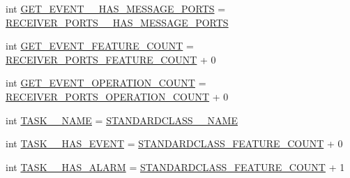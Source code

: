 \begin{DoxyCompactItemize}
\item 
int \hyperlink{interfaceshootingmachineemfmodel_1_1_shootingmachineemfmodel_package_a4ab331e8bfd030492ae5d6194070c1d7}{G\-E\-T\-\_\-\-E\-V\-E\-N\-T\-\_\-\-\_\-\-H\-A\-S\-\_\-\-M\-E\-S\-S\-A\-G\-E\-\_\-\-P\-O\-R\-T\-S} = \hyperlink{interfaceshootingmachineemfmodel_1_1_shootingmachineemfmodel_package_a7c53dc7a94983b99dae80e1d58d045c9}{R\-E\-C\-E\-I\-V\-E\-R\-\_\-\-P\-O\-R\-T\-S\-\_\-\-\_\-\-H\-A\-S\-\_\-\-M\-E\-S\-S\-A\-G\-E\-\_\-\-P\-O\-R\-T\-S}
\item 
int \hyperlink{interfaceshootingmachineemfmodel_1_1_shootingmachineemfmodel_package_aa16bb42c3e717881c0fe68d8d91c514d}{G\-E\-T\-\_\-\-E\-V\-E\-N\-T\-\_\-\-F\-E\-A\-T\-U\-R\-E\-\_\-\-C\-O\-U\-N\-T} = \hyperlink{interfaceshootingmachineemfmodel_1_1_shootingmachineemfmodel_package_adc6b75b7f3724a924c94d2ac5cbbcb58}{R\-E\-C\-E\-I\-V\-E\-R\-\_\-\-P\-O\-R\-T\-S\-\_\-\-F\-E\-A\-T\-U\-R\-E\-\_\-\-C\-O\-U\-N\-T} + 0
\item 
int \hyperlink{interfaceshootingmachineemfmodel_1_1_shootingmachineemfmodel_package_a9000680fce702b54d9bf48bd64789be7}{G\-E\-T\-\_\-\-E\-V\-E\-N\-T\-\_\-\-O\-P\-E\-R\-A\-T\-I\-O\-N\-\_\-\-C\-O\-U\-N\-T} = \hyperlink{interfaceshootingmachineemfmodel_1_1_shootingmachineemfmodel_package_a784cd8ee08945f45f89ceb08f5a717e5}{R\-E\-C\-E\-I\-V\-E\-R\-\_\-\-P\-O\-R\-T\-S\-\_\-\-O\-P\-E\-R\-A\-T\-I\-O\-N\-\_\-\-C\-O\-U\-N\-T} + 0
\item 
int \hyperlink{interfaceshootingmachineemfmodel_1_1_shootingmachineemfmodel_package_a62650844ac979a7c21389bde0193fea2}{T\-A\-S\-K\-\_\-\-\_\-\-N\-A\-M\-E} = \hyperlink{interfaceshootingmachineemfmodel_1_1_shootingmachineemfmodel_package_a06475d7d54d52ee19b2aaf4d5d73c738}{S\-T\-A\-N\-D\-A\-R\-D\-C\-L\-A\-S\-S\-\_\-\-\_\-\-N\-A\-M\-E}
\item 
int \hyperlink{interfaceshootingmachineemfmodel_1_1_shootingmachineemfmodel_package_ab400549825734d82cb9b6835551aacc6}{T\-A\-S\-K\-\_\-\-\_\-\-H\-A\-S\-\_\-\-E\-V\-E\-N\-T} = \hyperlink{interfaceshootingmachineemfmodel_1_1_shootingmachineemfmodel_package_a14037f66989b3107e402142df96ee9aa}{S\-T\-A\-N\-D\-A\-R\-D\-C\-L\-A\-S\-S\-\_\-\-F\-E\-A\-T\-U\-R\-E\-\_\-\-C\-O\-U\-N\-T} + 0
\item 
int \hyperlink{interfaceshootingmachineemfmodel_1_1_shootingmachineemfmodel_package_a86b86fa479cfc7162ae9b30bf99faa27}{T\-A\-S\-K\-\_\-\-\_\-\-H\-A\-S\-\_\-\-A\-L\-A\-R\-M} = \hyperlink{interfaceshootingmachineemfmodel_1_1_shootingmachineemfmodel_package_a14037f66989b3107e402142df96ee9aa}{S\-T\-A\-N\-D\-A\-R\-D\-C\-L\-A\-S\-S\-\_\-\-F\-E\-A\-T\-U\-R\-E\-\_\-\-C\-O\-U\-N\-T} + 1

\end{DoxyCompactItemize}
